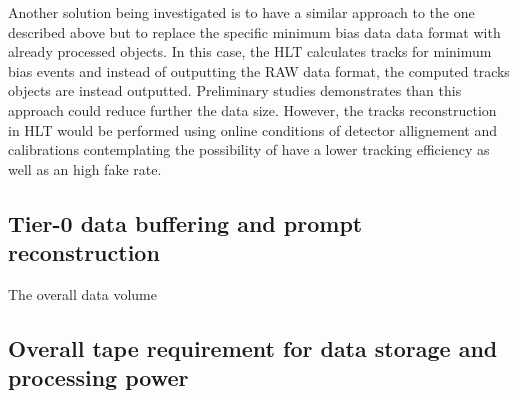 Another solution being investigated is to have a similar approach to the one described above but to replace the specific minimum bias data data format with already processed objects. In this case, the HLT calculates tracks for minimum bias events and instead of outputting the RAW data format, the computed tracks objects are instead outputted. Preliminary studies demonstrates than this approach could reduce further the data size. However, the tracks reconstruction in HLT would be performed using online conditions of detector allignement and calibrations contemplating the possibility of have a lower tracking efficiency as well as an high fake rate. 


\subsection{Tier-0 data buffering and prompt reconstruction\label{subsec:Tier-0}}
The overall data volume
\subsection{Overall tape requirement for data storage and processing power\label{subsec:processing}} 
